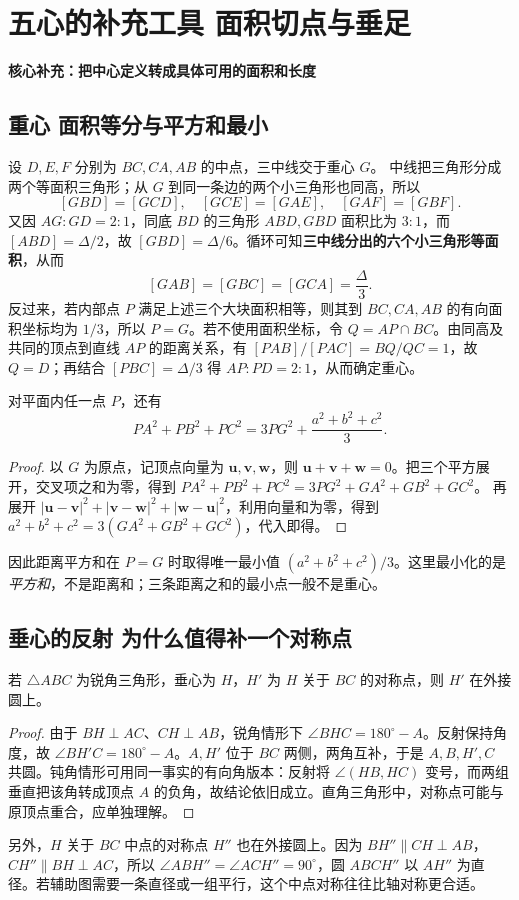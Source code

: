 \documentclass[lang=cn,12pt,fontset=none,a4paper,openany]{beautybook}
\newcommand{\level}[1]{\par\smallskip\noindent\textcolor{coverfgcolor}{\textbf{#1}}\quad}
\begin{document}
\chapter{五心的补充工具 面积切点与垂足}
\level{核心补充：把中心定义转成具体可用的面积和长度}
\section{重心 面积等分与平方和最小}
设 $D,E,F$ 分别为 $BC,CA,AB$ 的中点，三中线交于重心 $G$。
中线把三角形分成两个等面积三角形；从 $G$ 到同一条边的两个小三角形也同高，所以
\[
 [GBD]=[GCD],\quad [GCE]=[GAE],\quad [GAF]=[GBF].
\]
又因 $AG:GD=2:1$，同底 $BD$ 的三角形 $ABD,GBD$ 面积比为 $3:1$，而 $[ABD]=\Delta/2$，故 $[GBD]=\Delta/6$。循环可知\textbf{三中线分出的六个小三角形等面积}，从而
\[
 [GAB]=[GBC]=[GCA]=\frac{\Delta}{3}.
\]
反过来，若内部点 $P$ 满足上述三个大块面积相等，则其到 $BC,CA,AB$ 的有向面积坐标均为 $1/3$，所以 $P=G$。若不使用面积坐标，令 $Q=AP\cap BC$。由同高及共同的顶点到直线 $AP$ 的距离关系，有 $[PAB]/[PAC]=BQ/QC=1$，故 $Q=D$；再结合 $[PBC]=\Delta/3$ 得 $AP:PD=2:1$，从而确定重心。

对平面内任一点 $P$，还有
\[
 PA^2+PB^2+PC^2=3PG^2+\frac{a^2+b^2+c^2}{3}.
\]
\begin{proof}
以 $G$ 为原点，记顶点向量为 $\mathbf u,\mathbf v,\mathbf w$，则 $\mathbf u+\mathbf v+\mathbf w=0$。把三个平方展开，交叉项之和为零，得到
$PA^2+PB^2+PC^2=3PG^2+GA^2+GB^2+GC^2$。
再展开 $|\mathbf u-\mathbf v|^2+|\mathbf v-\mathbf w|^2+|\mathbf w-\mathbf u|^2$，利用向量和为零，得到 $a^2+b^2+c^2=3(GA^2+GB^2+GC^2)$，代入即得。
\end{proof}
因此距离平方和在 $P=G$ 时取得唯一最小值 $(a^2+b^2+c^2)/3$。这里最小化的是\emph{平方和}，不是距离和；三条距离之和的最小点一般不是重心。

\section{垂心的反射 为什么值得补一个对称点}
若 $\triangle ABC$ 为锐角三角形，垂心为 $H$，$H'$ 为 $H$ 关于 $BC$ 的对称点，则 $H'$ 在外接圆上。
\begin{proof}
由于 $BH\perp AC$、$CH\perp AB$，锐角情形下 $\angle BHC=180^\circ-A$。反射保持角度，故 $\angle BH'C=180^\circ-A$。$A,H'$ 位于 $BC$ 两侧，两角互补，于是 $A,B,H',C$ 共圆。钝角情形可用同一事实的有向角版本：反射将 $\angle(HB,HC)$ 变号，而两组垂直把该角转成顶点 $A$ 的负角，故结论依旧成立。直角三角形中，对称点可能与原顶点重合，应单独理解。
\end{proof}
另外，$H$ 关于 $BC$ 中点的对称点 $H''$ 也在外接圆上。因为 $BH''\parallel CH\perp AB$，$CH''\parallel BH\perp AC$，所以 $\angle ABH''=\angle ACH''=90^\circ$，圆 $ABCH''$ 以 $AH''$ 为直径。若辅助图需要一条直径或一组平行，这个中点对称往往比轴对称更合适。
\end{document}
